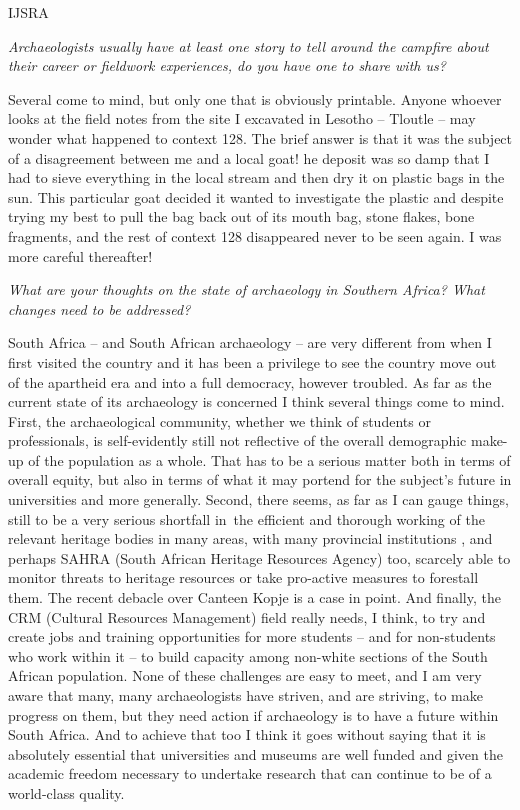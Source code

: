 \begin{labeling}{IJSRA}
\item[IJSRA] \emph{Archaeologists usually have at least one story to tell around the campfire about their career or fieldwork experiences, do you have one to share with us?}
	
\item[PM] 
Several come to mind, but only one that is obviously printable. Anyone whoever looks at the field notes from the site I excavated in Lesotho – Tloutle – may wonder what happened to context 128. The brief answer is that it was the subject of a disagreement between me and a local goat! he deposit was so damp that I had to sieve everything in the local stream and then dry it on plastic bags in the sun. This particular goat decided it wanted to investigate the plastic and despite trying my best to pull the bag back out of its mouth bag, stone flakes, bone fragments, and the rest of context 128 disappeared never to be seen again. I was more careful thereafter!


\item[IJSRA] \emph{What are your thoughts on the state of archaeology in Southern Africa? What changes need to be addressed?}
	
\item[PM] 
South Africa – and South African archaeology – are very different from when I first visited the country and it has been a privilege to see the country move out of the apartheid era and into a full democracy, however troubled. As far as the current state of its archaeology is concerned I think several things come to mind. First, the archaeological community, whether we think of students or professionals, is self-evidently still not reflective of the overall demographic make-up of the population as a whole. That has to be a serious matter both in terms of overall equity, but also in terms of what it may portend for the subject’s future in universities and more generally. Second, there seems, as far as I can gauge things, still to be a very serious shortfall in the efficient and thorough working of the relevant heritage bodies in many areas, with many provincial institutions , and perhaps SAHRA (South African Heritage Resources Agency) too, scarcely able to monitor threats to heritage resources or take pro-active measures to forestall them. The recent debacle over Canteen Kopje is a case in point. And finally, the CRM (Cultural Resources Management) field really needs, I think, to try and create jobs and training opportunities for more students – and for non-students who work within it – to build capacity among non-white sections of the South African population. None of these challenges are easy to meet, and I am very aware that many, many archaeologists have striven, and are striving, to make progress on them, but they need action if archaeology is to have a future within South Africa. And to achieve that too I think it goes without saying that it is absolutely essential that universities and museums are well funded and given the academic freedom necessary to undertake research that can continue to be of a world-class quality.


\end{labeling}
